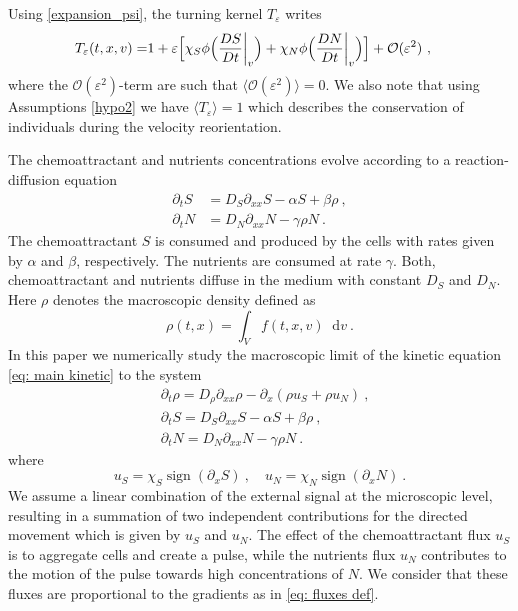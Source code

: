 \documentclass[11pt,twoside]{article}
\newcommand*\diff{\mathop{}\!\mathrm{d}}
\DeclareMathOperator{\sign}{sign}
\numberwithin{equation}{section}
\begin{document}
 
Using \eqref{expansion_psi}, the turning kernel $T_\varepsilon$ writes
\begin{align}
    T_\varepsilon(t,x,{v})=& 1+\varepsilon\Bigl[\chi_S\phi\Bigl(\frac{DS}{Dt}\bigg\rvert_{v}\Bigr)+ \chi_N\phi\Bigl(\frac{DN}{Dt}\bigg\rvert_{v}\Bigr)\Bigr]  + {\mathcal{O}(\varepsilon^2)} \ ,\label{eq: turning operator scaled}
\end{align}
{where the $\mathcal{O}(\varepsilon^2)$-term {are such that} $\langle\mathcal{O}(\varepsilon^2)\rangle=0$. We also note that using Assumptions \ref{hypo2} we have $\langle T_\varepsilon\rangle=1$ which describes the conservation of individuals during the velocity reorientation.}

The chemoattractant and nutrients concentrations evolve according to a reaction-diffusion equation
\begin{align}
    \partial_t S&=D_S\partial_{xx}S-\alpha S+\beta \rho\ ,\\
    \partial_t N&=D_N\partial_{xx}N-\gamma\rho N\ .
\end{align}
The chemoattractant $S$ is consumed and produced by the cells with rates given by $\alpha$ and $\beta$, respectively. The nutrients are consumed at rate $\gamma$. Both, chemoattractant and nutrients diffuse in the medium with constant $D_S$ and $D_N$. Here $\rho$ denotes the macroscopic density defined as
\[
\rho(t,x)=\int_Vf(t,x,v)\diff v\ .
\]
In this paper we numerically study the macroscopic limit of the kinetic equation \eqref{eq: main kinetic} to the system 
\begin{equation}
\begin{aligned}
&\partial_t\rho =D_\rho\partial_{xx}\rho-\partial_x (\rho u_S+\rho u_N)\ ,\\
&\partial_tS =D_S\partial_{xx} S-\alpha S+\beta \rho\ ,\\
&\partial_t N=D_N\partial_{xx} N-\gamma \rho N\ .\label{eq: macro system}
\end{aligned}
\end{equation}
where
\begin{equation}
u_S= \chi_S\sign(\partial_x S)\ , \quad u_N= \chi_N\sign(\partial_x N)\ .\label{eq: fluxes def}
\end{equation}
 We assume a linear combination of the external signal at the microscopic level, resulting in a summation of two independent contributions for the directed movement which is given by $u_S$ and $u_N$. The effect of the chemoattractant flux $u_S$ is to aggregate cells and create a pulse, while the nutrients flux $u_N$ contributes to the motion of the pulse towards high concentrations of $N$. We consider that these fluxes are proportional to the gradients as in \eqref{eq: fluxes def}.
\end{document}
